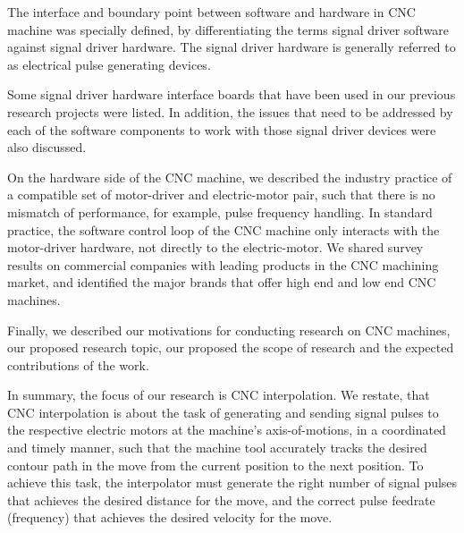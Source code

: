 The interface and boundary point between software and hardware in CNC machine was specially defined, by differentiating the terms signal driver software against signal driver hardware. The signal driver hardware is generally referred to as electrical pulse generating devices. 
\vspace*{1\baselineskip}

Some signal driver hardware interface boards that have been used in our previous research projects were listed. In addition, the issues that need to be addressed by each of the software components to work with those signal driver devices were also discussed.
\vspace*{1\baselineskip}
	
On the hardware side of the CNC machine, we described the industry practice of a compatible set of motor-driver and electric-motor pair, such that there is no mismatch of performance, for example, pulse frequency handling. In standard practice, the software control loop of the CNC machine only interacts with the motor-driver hardware, not directly to the electric-motor. We shared survey results on commercial companies with leading products in the CNC machining market, and identified the major brands that offer high end and low end CNC machines.   
\vspace*{1\baselineskip}
	
Finally, we described our motivations for conducting research on CNC machines, our proposed research topic, our proposed the scope of research and the expected contributions of the work. 
\vspace*{1\baselineskip}

In summary, the focus of our research is CNC interpolation. We restate, that CNC interpolation is about the task of generating and sending signal pulses to the respective electric motors at the machine's axis-of-motions, in a coordinated and timely manner, such that the machine tool accurately tracks the desired contour path in the move from the current position to the next position. To achieve this task, the interpolator must generate the right number of signal pulses that achieves the desired distance for the  move, and the correct pulse feedrate (frequency) that achieves the desired velocity for the move.    


